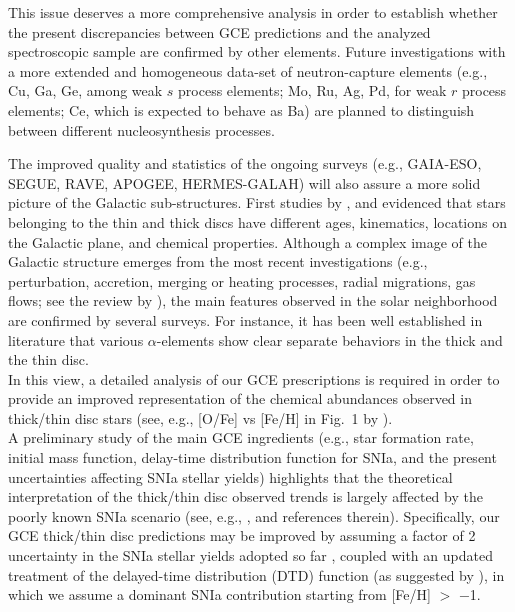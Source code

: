 \documentclass[manuscript]{aastex}
\begin{document}
This issue deserves a more comprehensive analysis in order to establish whether the 
present discrepancies between GCE predictions and the analyzed spectroscopic sample
are confirmed by other elements.
Future investigations with a more extended and homogeneous data-set of neutron-capture 
elements (e.g., Cu, Ga, Ge, among weak $s$ process elements; Mo, Ru, Ag, Pd, for weak
$r$ process elements; Ce, which is expected to behave as Ba) are planned to distinguish 
between different nucleosynthesis processes.



The improved quality and statistics of the ongoing surveys (e.g., GAIA-ESO, 
SEGUE, RAVE, APOGEE, HERMES-GALAH) will also assure a more solid picture of the Galactic
sub-structures. 
First studies by \citet{edvardsson93}, \citet{reddy03} and \citet{bensby03}
evidenced that stars belonging to the thin and thick discs have different ages, kinematics, 
locations on the Galactic plane, and chemical properties.
Although a complex image of the Galactic structure emerges from the most recent 
investigations (e.g., perturbation, accretion, merging or heating processes, radial
migrations, gas flows; see the review by \citealt{rix13}), the main features observed
in the solar neighborhood are confirmed by several surveys. For instance, it has been 
well established in literature that various $\alpha$-elements show clear separate behaviors
in the thick and the thin disc. 
\\
In this view, a detailed analysis of our GCE prescriptions is required in order to 
provide an improved representation of the chemical abundances observed in thick/thin disc stars
(see, e.g., [O/Fe] vs [Fe/H] in Fig.~1 by \citealt{bisterzo14}).
\\
A preliminary study of the main GCE ingredients (e.g., star formation rate, initial 
mass function, delay-time distribution function for SNIa, and the present uncertainties 
affecting SNIa stellar yields) highlights that the theoretical interpretation of the 
thick/thin disc observed trends is largely affected by the poorly known SNIa scenario (see,
e.g., \citealt{maoz14,ruiz14,travaglio15,marquardt15,hillebrandt13,ruiter09}, and 
references therein).
Specifically, our GCE thick/thin disc predictions may be improved by assuming a factor 
of 2 uncertainty in the SNIa stellar yields adopted so far \citep{travaglio05}, 
coupled with an updated treatment of the delayed-time distribution (DTD) function (as 
suggested by \citealt{kobayashi98,greggio05,matteucci09,kobayashi15}), in which we 
assume a dominant SNIa contribution starting from [Fe/H] $>$ $-$1.
\end{document}
